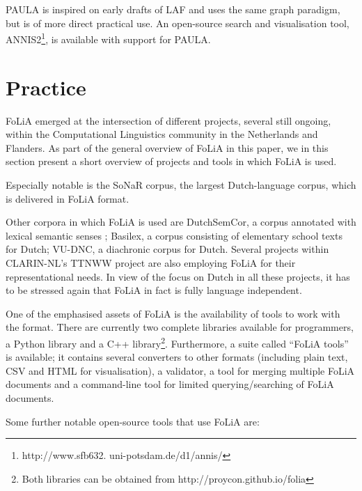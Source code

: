 \documentclass[a4paper,10pt,twoside]{article}
\begin{document}
PAULA is inspired on early drafts of LAF and uses the same graph paradigm, but
is of more direct practical use. An open-source search and visualisation tool,
ANNIS2\footnote{http://www.sfb632.  uni-potsdam.de/d1/annis/}, is available
with support for PAULA.


\section{Practice}
\label{sec:practice}

FoLiA emerged at the intersection of different projects, several still ongoing, within the Computational
Linguistics community in the Netherlands and Flanders. As part of the general overview of FoLiA in this paper, we in
this section present a short overview of projects and tools in which FoLiA is
used.
 
Especially notable is the SoNaR corpus, the largest Dutch-language corpus,
which is delivered in FoLiA format. 

Other corpora in which FoLiA is used are DutchSemCor, a corpus annotated with
lexical semantic senses \cite{DUTCHSEMCOR}; Basilex, a corpus consisting of
elementary school texts for Dutch; VU-DNC, a diachronic corpus for Dutch.
Several projects within CLARIN-NL's TTNWW project are also employing FoLiA for
their representational needs. In view of the focus on Dutch in all these
projects, it has to be stressed again that FoLiA in fact is fully language
independent.

One of the emphasised assets of FoLiA is the availability of tools to work with the
format. There are currently two complete libraries available for programmers, a Python
library and a C++ library\footnote{Both libraries can be obtained from
http://proycon.github.io/folia}. Furthermore, a suite called ``FoLiA tools'' is
available; it contains several converters to other formats (including plain
text, CSV and HTML for visualisation), a validator, a tool for merging
multiple FoLiA documents and a command-line tool for limited querying/searching of FoLiA documents.

Some further notable open-source tools that use FoLiA are:
\end{document}
